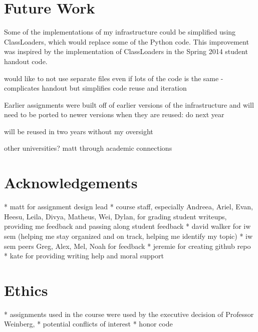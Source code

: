 \documentclass[pageno]{jpaper}
\begin{document}

\section*{Future Work}

Some of the implementations of my infrastructure could be simplified using ClassLoaders, which would replace some of the Python code.
This improvement was inspired by the implementation of ClassLoaders in the Spring 2014 student handout code.

would like to not use separate files even if lots of the code is the same - complicates handout but simplifies code reuse and iteration

Earlier assignments were built off of earlier versions of the infrastructure and will need to be ported to newer versions when they are reused: do next year

will be reused in two years without my oversight

other universities? matt through academic connections

\section*{Acknowledgements}
* matt for assignment design lead
* course staff, especially Andreea, Ariel, Evan, Heesu, Leila, Divya, Matheus, Wei, Dylan, for grading student writeups, providing me feedback and passing along student feedback
* david walker for iw sem (helping me stay organized and on track, helping me identify my topic)
* iw sem peers Greg, Alex, Mel, Noah for feedback
* jeremie for creating github repo
* kate for providing writing help and moral support

\section*{Ethics}
* assignments used in the course were used by the executive decision of Professor Weinberg,
* potential conflicts of interest
* honor code
\end{document}
